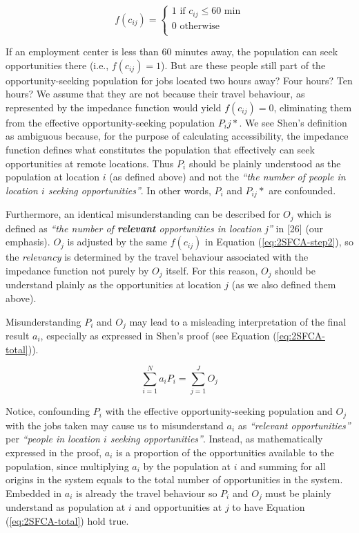 \documentclass[10pt,letterpaper]{article}
\begin{document}
\begin{equation}
\label{eq:binary-impedance}
f(c_{ij}) =
\begin{cases}
1\text{ if }c_{ij}\leq60\text{ min}\\
0\text{ otherwise}\\
\end{cases}
\end{equation}

If an employment center is less than 60 minutes away, the population can
seek opportunities there (i.e., \(f(c_{ij})=1\)). But are these people
still part of the opportunity-seeking population for jobs located two
hours away? Four hours? Ten hours? We assume that they are not because
their travel behaviour, as represented by the impedance function would
yield \(f(c_{ij})=0\), eliminating them from the effective
opportunity-seeking population \(P_ij*\). We see Shen's definition as
ambiguous because, for the purpose of calculating accessibility, the
impedance function defines what constitutes the population that
effectively can seek opportunities at remote locations. Thus \(P_i\)
should be plainly understood as the population at location \(i\) (as
defined above) and not the \emph{``the number of people in location
\(i\) seeking opportunities''}. In other words, \(P_i\) and \(P_{ij}*\)
are confounded.

Furthermore, an identical misunderstanding can be described for \(O_j\)
which is defined as \emph{``the number of \textbf{relevant}
opportunities in location j''} in {[}26{]} (our emphasis). \(O_j\) is
adjusted by the same \(f(c_{ij})\) in Equation (\ref{eq:2SFCA-step2}),
so the \emph{relevancy} is determined by the travel behaviour associated
with the impedance function not purely by \(O_j\) itself. For this
reason, \(O_j\) should be understand plainly as the opportunities at
location \(j\) (as we also defined them above).

Misunderstanding \(P_i\) and \(O_j\) may lead to a misleading
interpretation of the final result \(a_i\), especially as expressed in
Shen's proof (see Equation (\ref{eq:2SFCA-total})).

\begin{equation}
\label{eq:2SFCA-total}
\sum_{i=1}^N a_{i} P_i= \sum_{j=1}^JO_j
\end{equation}

Notice, confounding \(P_i\) with the effective opportunity-seeking
population and \(O_j\) with the jobs taken may cause us to misunderstand
\(a_{i}\) as \emph{``relevant opportunities''} per \emph{``people in
location \(i\) seeking opportunities''}. Instead, as mathematically
expressed in the proof, \(a_{i}\) is a proportion of the opportunities
available to the population, since multiplying \(a_i\) by the population
at \(i\) and summing for all origins in the system equals to the total
number of opportunities in the system. Embedded in \(a_i\) is already
the travel behaviour so \(P_i\) and \(O_j\) must be plainly understand
as population at \(i\) and opportunities at \(j\) to have Equation
(\ref{eq:2SFCA-total}) hold true.
\end{document}
